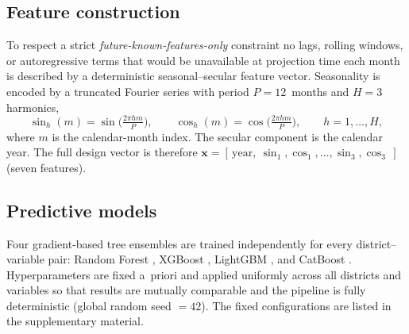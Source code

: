 \documentclass[review,11pt]{elsarticle}
\begin{document}
\subsection{Feature construction}\label{sec:features}
To respect a strict \emph{future-known-features-only} constraint no lags,
rolling windows, or autoregressive terms that would be unavailable at projection
time each month is described by a deterministic seasonal--secular feature
vector. Seasonality is encoded by a truncated Fourier series with period
$P=12$~months and $H=3$ harmonics,
\begin{equation}
\sin_{h}(m)=\sin\!\Big(\tfrac{2\pi h m}{P}\Big),\qquad
\cos_{h}(m)=\cos\!\Big(\tfrac{2\pi h m}{P}\Big),\qquad h=1,\dots,H,
\end{equation}
where $m$ is the calendar-month index. The secular component is the calendar
year. The full design vector is therefore
$\mathbf{x}=[\,\mathrm{year},\ \sin_{1},\cos_{1},\dots,\sin_{3},\cos_{3}\,]$
(seven features).

\subsection{Predictive models}\label{sec:models}
Four gradient-based tree ensembles are trained independently for every
district--variable pair: Random Forest \citep{Breiman2001}, XGBoost
\citep{chen2016xgboost}, LightGBM \citep{ke2017lightgbm}, and CatBoost
\citep{prokhorenkova2018catboost}. Hyperparameters are fixed a~priori and applied
uniformly across all districts and variables so that results are mutually
comparable and the pipeline is fully deterministic (global random seed $=42$).
The fixed configurations are listed in the supplementary material.
\end{document}
